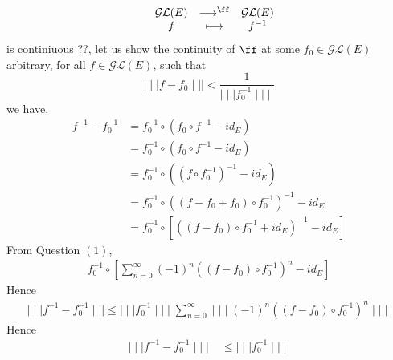 \begin{enumerate}[(1)]
		     \[
		     \begin{array}{cccc}
		             &  \mathcal{G} 
			      \mathcal{L} (E) & \longrightarrow^{\ff }& 
			      \mathcal{G} \mathcal{L} (E) \\
		                &  f  & \longmapsto     & f^{-1} \\ 
		     \end{array}
		     \]
		     is continiuous ??, let us show 
		     the continuity  of 
		     $\ff  $ at some $f_0 \in 
		     \mathcal{G} \mathcal{L} (E) $
		     arbitrary, for all $f \in  
		     \mathcal{G} \mathcal{L} (E) $, such that
		     \[
		     \mid \mid \mid  f-f_0 \mid \mid \mid  
		     < 
		     \frac{1}{\mid \mid \mid  f_0^{-1} \mid \mid \mid }
		     \]
		     we have,
		     \begin{align*}
			     f^{-1}-f_0^{-1} &=
			     f_0^{-1} \circ 
			     \left( f_0 \circ  f^{-1}
			     - id_{E}\right) \\
					     &= 
					     f_0^{-1} \circ 
					     \left( 
					    f_0
				    \circ f^{-1} - id_{E}\right) 
				    \\
					     &=
		f_0^{-1} \circ 
		\left( \left( f \circ f_0^{-1} \right)
		^{-1} - id_{E}\right) \\
					     &=
		f_0^{-1} \circ 
		\left( 
			\left( f-f_0+f_0 \right)
			\circ f_0^{-1}
		\right)^{-1} - id_{E} \\
					     &= f_0^{-1}
					\circ 
	\left[ 
		\left( 
			\left( 
				f-f_0
			\right) \circ 
			f_0^{-1} + id_{E}
		\right)^{-1} 
		-id_{E}
	\right]
		     \end{align*}
		     From Question $(1)$, 
		     \begin{align*}
		     f_0^{-1}
		     \circ 
		     \left[ 
			     \sum_{n=0}^{\infty}  
			   (-1) ^n 
			   \left( 
				   \left( f-f_0 \right)
				   \circ f_0^{-1}
			   \right)^n -id_{E}
		     \right]
		     \end{align*}
		     Hence 
		     \begin{align*}
		     \mid \mid \mid  f^{-1}
		     - f_0^{-1}\mid \mid \mid  
		     \leq 
		     \mid \mid \mid  f_0^{-1} \mid \mid \mid  
		    \sum_{n=0}^{\infty}  
		    \mid \mid \mid  (-1) ^n 
		    \left( 
			    \left( f-f_0 \right)
			    \circ f_0^{-1}
		    \right)^n 
		    \mid \mid \mid 
		     \end{align*} 
		     Hence 
		     \begin{align*}
		     \mid \mid \mid  f^{-1}
		     -f_0^{-1}\mid \mid \mid  
		     & \leq 
		     \mid \mid \mid  f_0^{-1} \mid \mid \mid  

\end{align*}
\end{enumerate}
